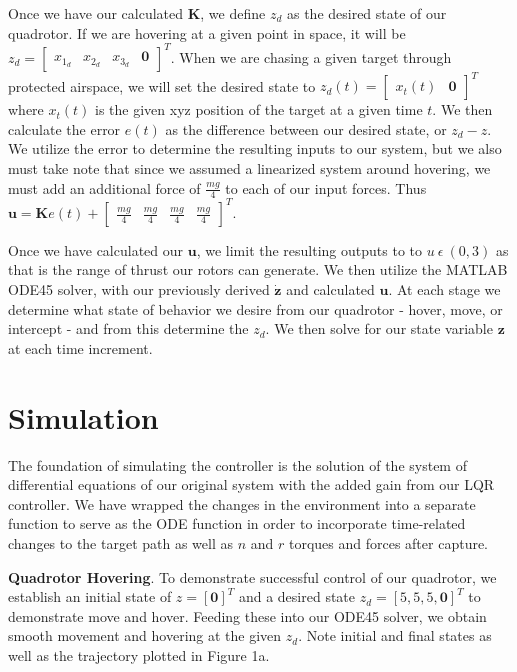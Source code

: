 \documentclass{article}
\begin{document}
\begin{multicols}{2}
Once we have our calculated $\boldsymbol{K}$, we define $z_d$ as the desired state of our quadrotor. If we are hovering  
at a given point in space, it will be $z_d=\begin{bmatrix} x_{1_d} & x_{2_d} & x_{3_d} & \boldsymbol{0} \end{bmatrix}^T$. When we are chasing a given target through protected airspace, we will set the desired state to $z_d(t)=\begin{bmatrix} x_t(t) & \boldsymbol{0} \end{bmatrix}^T$ where $x_t(t)$ is the given xyz position of the target at a given time $t$. We then calculate the error $e(t)$ as the difference between our desired state, or $z_d - z$. We utilize the error to determine the resulting inputs to our system, but we also must take note that since we assumed a linearized system around hovering, we must add an additional force of $\frac{mg}{4}$ to each of our input forces. Thus $\boldsymbol{u}= \boldsymbol{K}e(t) + \begin{bmatrix}\frac{mg}{4} & \frac{mg}{4} & \frac{mg}{4} & \frac{mg}{4}\end{bmatrix}^T$. 

Once we have calculated our $\boldsymbol{u}$, we limit the resulting outputs to to $u\  \epsilon\  (0, 3)$ as that is the range of thrust our rotors can generate. We then utilize the MATLAB ODE45 solver, with our previously derived $\boldsymbol{\dot{z}}$ and calculated $\boldsymbol{u}$. At each stage we determine what state of behavior we desire from our quadrotor - hover, move, or intercept - and from this determine the $z_d$. We then solve for our state variable $\boldsymbol{z}$ at each time increment.

\section*{Simulation}
\noindent
The foundation of simulating the controller is the solution of the system of differential equations of our original system with the added gain from our LQR controller.  We have wrapped the changes in the environment into a separate function to serve as the ODE 
function in order to incorporate time-related changes to the target path as well as $n$ and $r$ torques and forces after capture.

\noindent\textbf{Quadrotor Hovering}. To demonstrate successful control of our quadrotor, we establish an initial state of $z=[\mathbf{0}]^T$ and a desired state $z_d=[5,5,5,\boldsymbol{0}]^T $ to demonstrate move and hover.  Feeding these into our ODE45 solver, we obtain smooth movement and hovering at the given $z_d$. Note initial and final states as well as the trajectory plotted in Figure 1a.


\end{multicols}
\end{document}
